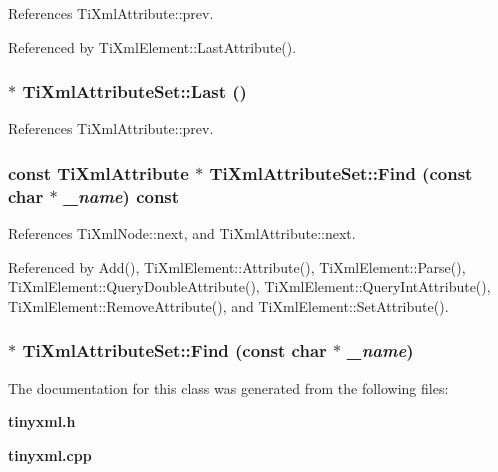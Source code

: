 References TiXmlAttribute::prev.

Referenced by TiXmlElement::LastAttribute().
\subsubsection[Last]{$\ast$ TiXmlAttributeSet::Last ()\hspace{0.3cm}{\tt  [inline]}}\label{classTiXmlAttributeSet_b4c4edfb2d74f6ea31aae096743bd6e0}




References TiXmlAttribute::prev.
\subsubsection[Find]{\setlength{\rightskip}{0pt plus 5cm}const {\bf TiXmlAttribute} $\ast$ TiXmlAttributeSet::Find (const char $\ast$ {\em \_\-name}) const}\label{classTiXmlAttributeSet_acbbc5e1a1c987e72815430e89fcb58b}




References TiXmlNode::next, and TiXmlAttribute::next.

Referenced by Add(), TiXmlElement::Attribute(), TiXmlElement::Parse(), TiXmlElement::QueryDoubleAttribute(), TiXmlElement::QueryIntAttribute(), TiXmlElement::RemoveAttribute(), and TiXmlElement::SetAttribute().
\subsubsection[Find]{$\ast$ TiXmlAttributeSet::Find (const char $\ast$ {\em \_\-name})\hspace{0.3cm}{\tt  [inline]}}\label{classTiXmlAttributeSet_2f210bed54c832adf1683c44c35727b9}




The documentation for this class was generated from the following files:\begin{CompactItemize}
\item 
{\bf tinyxml.h}\item 
{\bf tinyxml.cpp}\end{CompactItemize}
